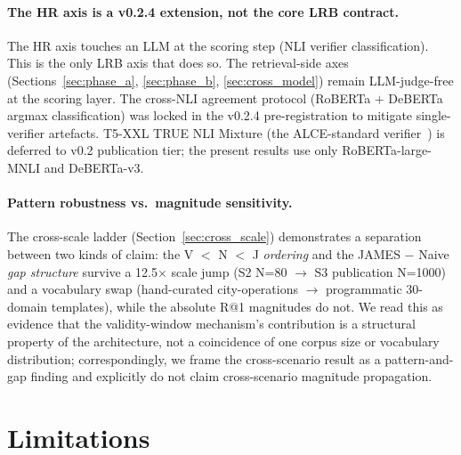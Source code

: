 \documentclass[11pt,a4paper]{article}
\begin{document}
\paragraph{The HR axis is a v0.2.4 extension, not the core LRB contract.} The HR axis touches an LLM at the scoring step (NLI verifier classification). This is the only LRB axis that does so. The retrieval-side axes (Sections~\ref{sec:phase_a}, \ref{sec:phase_b}, \ref{sec:cross_model}) remain LLM-judge-free at the scoring layer. The cross-NLI agreement protocol (RoBERTa $+$ DeBERTa argmax classification) was locked in the v0.2.4 pre-registration to mitigate single-verifier artefacts. T5-XXL TRUE NLI Mixture (the ALCE-standard verifier~\cite{gao2023alce}) is deferred to v0.2 publication tier; the present results use only RoBERTa-large-MNLI and DeBERTa-v3.

\paragraph{Pattern robustness vs.~magnitude sensitivity.} The cross-scale ladder (Section~\ref{sec:cross_scale}) demonstrates a separation between two kinds of claim: the V $<$ N $<$ J \emph{ordering} and the JAMES $-$ Naive \emph{gap structure} survive a 12.5$\times$ scale jump (S2 N=80 $\to$ S3 publication N=1000) and a vocabulary swap (hand-curated city-operations $\to$ programmatic 30-domain templates), while the absolute R@1 magnitudes do not. We read this as evidence that the validity-window mechanism's contribution is a structural property of the architecture, not a coincidence of one corpus size or vocabulary distribution; correspondingly, we frame the cross-scenario result as a pattern-and-gap finding and explicitly do not claim cross-scenario magnitude propagation.

\section{Limitations}
\label{sec:limitations}
\end{document}
